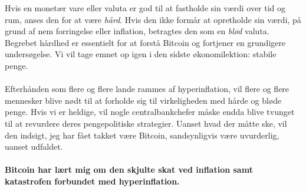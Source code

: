 \documentclass[paper=6in:9in,pagesize=pdftex,
               headinclude=on,footinclude=on,12pt]{scrbook}
\begin{document}
Hvis en monetær vare eller valuta er god til at fastholde sin værdi over tid og rum, anses den for at være \textit{hård}. Hvis den ikke formår at opretholde sin værdi, på grund af nem forringelse eller inflation, betragtes den som en \textit{blød} valuta. Begrebet hårdhed er essentielt for at forstå Bitcoin og fortjener en grundigere undersøgelse. Vi vil tage emnet op igen i den sidste økonomilektion: stabile penge.\paragraph{} Efterhånden som flere og flere lande rammes af hyperinflation, vil flere og flere mennesker blive nødt til at forholde sig til virkeligheden med hårde og bløde penge. Hvis vi er heldige, vil nogle centralbankchefer måske endda blive tvunget til at revurdere deres pengepolitiske strategier. Uanset hvad der måtte ske, vil den indsigt, jeg har fået takket være Bitcoin, sandsynligvis være uvurderlig, uanset udfaldet.\paragraph{Bitcoin har lært mig om den skjulte skat ved inflation samt katastrofen forbundet med hyperinflation.}%
%
%
%
%
%
\end{document}
